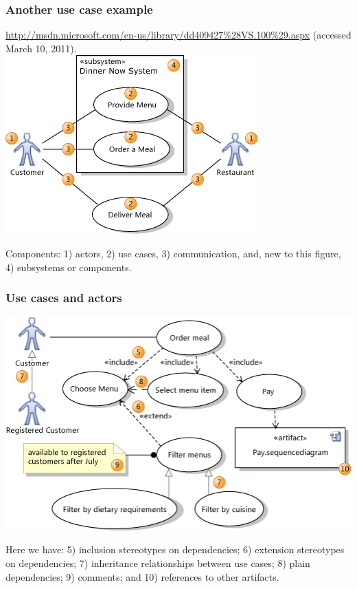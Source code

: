 \begin{frame}[fragile]
\frametitle{Another use case example}

\begin{center}
\scriptsize \url{http://msdn.microsoft.com/en-us/library/dd409427%28VS.100%29.aspx}
(accessed March 10, 2011).\\[1em]

\includegraphics[width=.5\textwidth]{images/dinnernow.png}
\end{center}


\begin{changemargin}{1cm}
Components: 1) actors, 2) use cases, 3) communication, and, new to this
figure, 4) subsystems or components. 
\end{changemargin}

\end{frame}

\begin{frame}
\frametitle{Use cases and actors}

\begin{center}
\includegraphics[width=.55\textwidth]{images/dinnernow2.png}
\end{center}

\begin{changemargin}{1cm}

Here we have: 5) inclusion stereotypes on dependencies; 6) extension
stereotypes on dependencies; 7) inheritance relationships between use cases;
8) plain dependencies; 9) comments; and 10) references to other artifacts.

\end{changemargin}
\end{frame}


